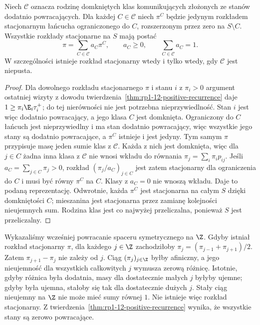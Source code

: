 \begin{wniosek}
\label{cor:rp1-12-stationary-mixtures}
Niech $\mathscr C$ oznacza rodzinę domkniętych klas
komunikujących złożonych ze stanów dodatnio
powracających. Dla każdej $C\in\mathscr C$ niech
$\pi^C$ będzie jedynym rozkładem stacjonarnym
łańcucha ograniczonego do $C$, rozszerzonym przez
zero na $S\setminus C$. Wszystkie rozkłady stacjonarne
na $S$ mają postać
\[
\pi=\sum_{C\in\mathscr C}a_C\pi^C,\qquad
a_C\geq0,\qquad\sum_{C\in\mathscr C}a_C=1.
\]
W szczególności istnieje rozkład stacjonarny wtedy
i tylko wtedy, gdy $\mathscr C$ jest niepusta.
\end{wniosek}
\begin{proof}
Dla dowolnego rozkładu stacjonarnego $\pi$ i stanu
$i$ z $\pi_i>0$ argument ostatniej wizyty z dowodu
twierdzenia~\ref{thm:rp1-12-positive-recurrence}
daje $1\geq\pi_i\E_i\tau_i^+$; do tej nierówności
nie jest potrzebna nieprzywiedlność. Stan $i$
jest więc dodatnio powracający, a jego klasa $C$
jest domknięta. Ograniczony do $C$ łańcuch jest
nieprzywiedlny i ma stan dodatnio powracający,
więc wszystkie jego stany są dodatnio powracające,
a $\pi^C$ istnieje i jest jedyny.
Tym samym $\pi$ przypisuje masę jeden sumie klas
z $\mathscr C$. Każda z nich jest domknięta, więc
dla $j\in C$ żadna inna klasa z $\mathscr C$ nie
wnosi wkładu do równania $\pi_j=\sum_i\pi_i p_{ij}$.
Jeśli $a_C=\sum_{j\in C}\pi_j>0$, rozkład
$(\pi_j/a_C)_{j\in C}$ jest zatem stacjonarny dla
ograniczenia do $C$ i musi być równy $\pi^C$ na $C$.
Klasy z $a_C=0$ nie wnoszą wkładu. Daje to
podaną reprezentację. Odwrotnie, każda $\pi^C$
jest stacjonarna na całym $S$ dzięki domkniętości $C$;
mieszanina jest stacjonarna przez zamianę kolejności
nieujemnych sum. Rodzina klas jest co najwyżej
przeliczalna, ponieważ $S$ jest przeliczalny.
\end{proof}

\begin{przyklad}
Wykazaliśmy wcześniej powracanie spaceru symetrycznego
na $\Z$. Gdyby istniał rozkład stacjonarny $\pi$,
dla każdego $j\in\Z$ zachodziłoby
$\pi_j=(\pi_{j-1}+\pi_{j+1})/2$.
Zatem $\pi_{j+1}-\pi_j$ nie zależy od $j$.
Ciąg $(\pi_j)_{j\in\Z}$ byłby afiniczny,
a jego nieujemność dla wszystkich całkowitych
$j$ wymusza zerową różnicę. Istotnie, gdyby różnica była dodatnia, masy
dla dostatecznie małych $j$ byłyby ujemne;
gdyby była ujemna, stałoby się tak dla
dostatecznie dużych $j$. Stały ciąg nieujemny
na $\Z$ nie może mieć sumy równej $1$.
Nie istnieje więc rozkład stacjonarny.
Z twierdzenia~\ref{thm:rp1-12-positive-recurrence}
wynika, że wszystkie stany są zerowo powracające.
\end{przyklad}

